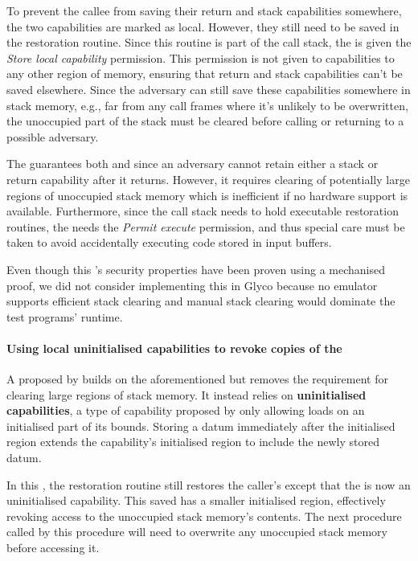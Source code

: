 \documentclass[main.tex]{subfiles}
\begin{document}
To prevent the callee from saving their return and stack capabilities somewhere, the two capabilities are marked as local. However, they still need to be saved in the restoration routine. Since this routine is part of the call stack, the  is given the \emph{Store local capability} permission. This permission is not given to capabilities to any other region of memory, ensuring that return and stack capabilities can't be saved elsewhere. Since the adversary can still save these capabilities somewhere in stack memory, e.g., far from any call frames where it's unlikely to be overwritten, the unoccupied part of the stack must be cleared before calling or returning to a possible adversary.

The  guarantees both  and  since an adversary cannot retain either a stack or return capability after it returns. However, it requires clearing of potentially large regions of unoccupied stack memory which is inefficient if no hardware support is available. Furthermore, since the call stack needs to hold executable restoration routines, the  needs the \emph{Permit execute} permission, and thus special care must be taken to avoid accidentally executing code stored in input buffers.

Even though this 's security properties have been proven using a mechanised proof, we did not consider implementing this  in Glyco because no emulator supports efficient stack clearing and manual stack clearing would dominate the test programs' runtime.

\paragraph{Using local uninitialised capabilities to revoke copies of the } A  proposed by \cite{uninitcapss,uninitcaps} builds on the aforementioned  but removes the requirement for clearing large regions of stack memory. It instead relies on \textbf{uninitialised capabilities}, a type of capability proposed by \cite{uninitcapss} only allowing loads on an initialised part of its bounds. Storing a datum immediately after the initialised region extends the capability's initialised region to include the newly stored datum.

In this , the restoration routine still restores the caller's  except that the  is now an uninitialised capability. This saved  has a smaller initialised region, effectively revoking access to the unoccupied stack memory's contents. The next procedure called by this procedure will need to overwrite any unoccupied stack memory before accessing it.
\end{document}
